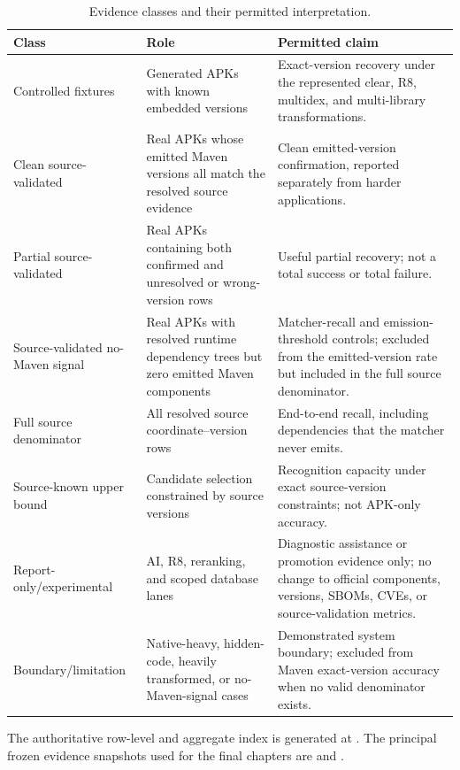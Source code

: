 \begin{table}[H]
\centering
\caption{Evidence classes and their permitted interpretation.}
\label{tab:appendix-evidence-classes}
\begin{tabularx}{\textwidth}{L{0.24\textwidth}L{0.28\textwidth}X}
\toprule
\textbf{Class} & \textbf{Role} & \textbf{Permitted claim}\\
\midrule
Controlled fixtures & Generated APKs with known embedded versions &
Exact-version recovery under the represented clear, R8, multidex, and
multi-library transformations.\\
Clean source-validated & Real APKs whose emitted Maven versions all match the
resolved source evidence & Clean emitted-version confirmation, reported
separately from harder applications.\\
Partial source-validated & Real APKs containing both confirmed and unresolved
or wrong-version rows & Useful partial recovery; not a total success or total
failure.\\
Source-validated no-Maven signal & Real APKs with resolved runtime dependency
trees but zero emitted Maven components & Matcher-recall and emission-threshold
controls; excluded from the emitted-version rate but included in the full
source denominator.\\
Full source denominator & All resolved source coordinate--version rows &
End-to-end recall, including dependencies that the matcher never emits.\\
Source-known upper bound & Candidate selection constrained by source versions
& Recognition capacity under exact source-version constraints; not APK-only
accuracy.\\
Report-only/experimental & AI, R8, reranking, and scoped database lanes &
Diagnostic assistance or promotion evidence only; no change to official
components, versions, SBOMs, CVEs, or source-validation metrics.\\
Boundary/limitation & Native-heavy, hidden-code, heavily transformed, or
no-Maven-signal cases & Demonstrated system boundary; excluded from Maven
exact-version accuracy when no valid denominator exists.\\
\bottomrule
\end{tabularx}
\end{table}

The authoritative row-level and aggregate index is generated at
. The principal frozen evidence
snapshots used for the final chapters are
 and
.

